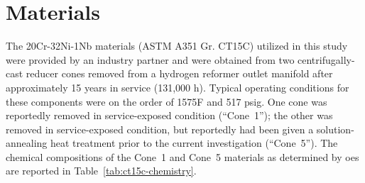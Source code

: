 \chapter{Materials}\label{ch:materials}
The 20Cr-32Ni-1Nb materials (ASTM A351 Gr. CT15C) utilized in this study were provided by an industry partner and were obtained from two centrifugally-cast reducer cones removed from a hydrogen reformer outlet manifold after approximately 15 years in service (131,000 h). Typical operating conditions for these components were on the order of 1575\textdegree{}F and 517 psig.  One cone was reportedly removed in service-exposed condition (``Cone~1''); the other was removed in service-exposed condition, but reportedly had been given a solution-annealing heat treatment prior to the current investigation (``Cone~5''). The chemical compositions of the Cone~1 and Cone~5 materials as determined by \gls{oes} are reported in Table~\ref{tab:ct15c-chemistry}.

